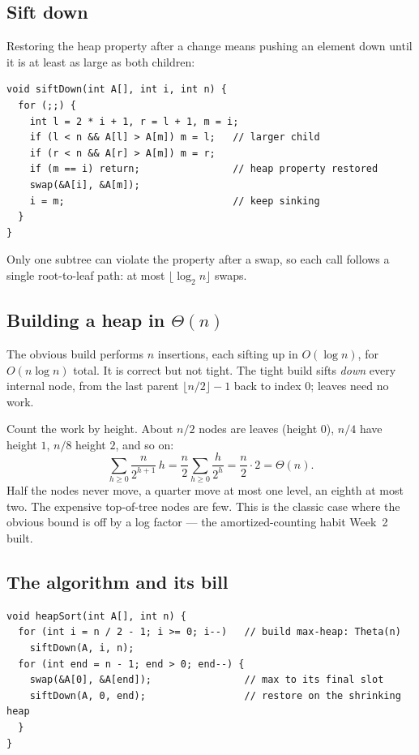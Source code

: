\documentclass[11pt]{article}
\begin{document}
\subsection{Sift down}

Restoring the heap property after a change means pushing an element down until it is at least as large as both children:

\begin{verbatim}
void siftDown(int A[], int i, int n) {
  for (;;) {
    int l = 2 * i + 1, r = l + 1, m = i;
    if (l < n && A[l] > A[m]) m = l;   // larger child
    if (r < n && A[r] > A[m]) m = r;
    if (m == i) return;                // heap property restored
    swap(&A[i], &A[m]);
    i = m;                             // keep sinking
  }
}
\end{verbatim}

Only one subtree can violate the property after a swap, so each call follows a single root-to-leaf path: at most $\lfloor\log_2 n\rfloor$ swaps.

\subsection{Building a heap in $\Theta(n)$}

The obvious build performs $n$ insertions, each sifting up in $O(\log n)$, for $O(n\log n)$ total. It is correct but not tight. The tight build sifts \emph{down} every internal node, from the last parent $\lfloor n/2\rfloor-1$ back to index $0$; leaves need no work.

Count the work by height. About $n/2$ nodes are leaves (height $0$), $n/4$ have height $1$, $n/8$ height $2$, and so on:
\[
  \sum_{h\ge0}\frac{n}{2^{h+1}}\,h
  = \frac{n}{2}\sum_{h\ge0}\frac{h}{2^{h}}
  = \frac{n}{2}\cdot 2
  = \Theta(n).
\]
Half the nodes never move, a quarter move at most one level, an eighth at most two. The expensive top-of-tree nodes are few. This is the classic case where the obvious bound is off by a log factor --- the amortized-counting habit Week~2 built.

\subsection{The algorithm and its bill}

\begin{verbatim}
void heapSort(int A[], int n) {
  for (int i = n / 2 - 1; i >= 0; i--)   // build max-heap: Theta(n)
    siftDown(A, i, n);
  for (int end = n - 1; end > 0; end--) {
    swap(&A[0], &A[end]);                // max to its final slot
    siftDown(A, 0, end);                 // restore on the shrinking heap
  }
}
\end{verbatim}
\end{document}
